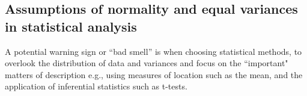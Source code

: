 \documentclass[10pt]{elsarticle}
\begin{document}




\subsection{Assumptions of normality and equal variances in statistical analysis}

A potential warning sign or ``bad smell'' is when choosing statistical methods, to overlook the distribution of data and variances and focus on the ``important" matters of description e.g., using measures of location such as the mean, and the application of inferential statistics such as t-tests.
\end{document}
